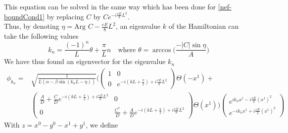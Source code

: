 This equation can be solved in the same way which has been done for \cref{nef-boundCond1} by replacing $C$ by $Ce^{-i\frac{eE}{8}L^2}$. \\
Thus, by denoting $\eta = \textrm{Arg } C - \frac{eE}{8}L^2 $, an eigenvalue $k$ of the Hamiltonian can take the following values
\begin{equation}
k_{n} = \frac{(-1)^n}{L} \theta+ \frac{\pi}{L}n 
\quad \textrm{where $\theta = \arccos\bigg( \frac{-|C| \sin \eta}{A} \bigg)$}
\end{equation}
We have thus found an eigenvector for the eigenvalue $k_n$
\begin{equation} 
\begin{split}
\phi_{k_{n}} = 
& \sqrt{\frac{1}{L(\alpha - \beta \sin (k_{n}L - \eta))}} \Bigg( 
\begin{pmatrix}
1 & 0 \\
0  & e^{-i(kL + \frac{\pi}{2}) + i\frac{eE}{8}L^2}
\end{pmatrix}
\Theta(-x^1) + \\
& \begin{pmatrix}
\frac{A}{D}  +  \frac{C}{D} e^{-i(kL + \frac{\pi}{2})+ i\frac{eE}{8}L^2} & 0 \\
0  & \frac{C^*}{D}  + \frac{A}{D}e^{-i(kL + \frac{\pi}{2} ) + i\frac{eE}{8}L^2}
\end{pmatrix}\Theta(x^1)\Bigg)
\begin{pmatrix}
e^{ik_{n} x^1 -  i\frac{eE}{2}(x^1)^2} \\
e^{- ik_{n} x^1 + i\frac{eE}{2}(x^1)^2}
\end{pmatrix}
\end{split}
\end{equation}
With $z = x^0 - y^0 - x^1 + y^1$, we define
